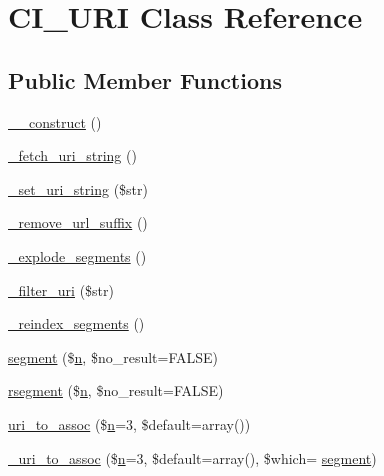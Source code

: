 \hypertarget{class_c_i___u_r_i}{}\section{C\+I\+\_\+\+U\+RI Class Reference}
\label{class_c_i___u_r_i}
\subsection*{Public Member Functions}
\begin{DoxyCompactItemize}
\item 
\hyperlink{class_c_i___u_r_i_a095c5d389db211932136b53f25f39685}{\+\_\+\+\_\+construct} ()
\item 
\hyperlink{class_c_i___u_r_i_adfc05ba05789de235466da80e2a34883}{\+\_\+fetch\+\_\+uri\+\_\+string} ()
\item 
\hyperlink{class_c_i___u_r_i_a81a4c4d50fbac24b9ae091f9cfcaade3}{\+\_\+set\+\_\+uri\+\_\+string} (\$str)
\item 
\hyperlink{class_c_i___u_r_i_a5f02a9ac7030eaf1140aacb4863af960}{\+\_\+remove\+\_\+url\+\_\+suffix} ()
\item 
\hyperlink{class_c_i___u_r_i_a26cd2b70f2ca8ddfe42a74e7c9c71068}{\+\_\+explode\+\_\+segments} ()
\item 
\hyperlink{class_c_i___u_r_i_ac1f311bdebd0d37a5f255562a5874dc7}{\+\_\+filter\+\_\+uri} (\$str)
\item 
\hyperlink{class_c_i___u_r_i_a12533dc88e2061577867a91fa4f25c34}{\+\_\+reindex\+\_\+segments} ()
\item 
\hyperlink{class_c_i___u_r_i_a6f0bc9309bced907b54cf2178b359b9c}{segment} (\$\hyperlink{fullpage_2plugin_8min_8js_ab767a859d1217315f42c9bb52fc648dc}{n}, \$no\+\_\+result=F\+A\+L\+SE)
\item 
\hyperlink{class_c_i___u_r_i_afe281d36faa29580e32aed250c88af80}{rsegment} (\$\hyperlink{fullpage_2plugin_8min_8js_ab767a859d1217315f42c9bb52fc648dc}{n}, \$no\+\_\+result=F\+A\+L\+SE)
\item 
\hyperlink{class_c_i___u_r_i_a67cca74de71898ee88c167a265cff140}{uri\+\_\+to\+\_\+assoc} (\$\hyperlink{fullpage_2plugin_8min_8js_ab767a859d1217315f42c9bb52fc648dc}{n}=3, \$default=array())
\item 
\hyperlink{class_c_i___u_r_i_a8f7962a57049a3767fdfa4c1a004dc98}{\+\_\+uri\+\_\+to\+\_\+assoc} (\$\hyperlink{fullpage_2plugin_8min_8js_ab767a859d1217315f42c9bb52fc648dc}{n}=3, \$default=array(), \$which= \textquotesingle{}\hyperlink{class_c_i___u_r_i_a6f0bc9309bced907b54cf2178b359b9c}{segment}\textquotesingle{})

\end{DoxyCompactItemize}
